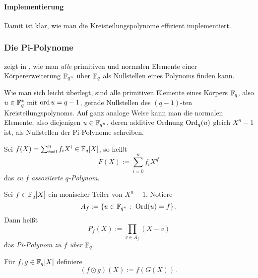 \paragraph{Implementierung}

Damit ist klar, wie man die Kreisteilungspolynome effizient implementiert.




\subsubsection{Die Pi-Polynome}

\citeauthor{hach92} zeigt in \autocite{hach92}, wie man
\emph{alle} primitiven und normalen Elemente einer Körpererweiterung $\mathbb{F}_{q^n}$
über $\mathbb{F}_q$ als Nullstellen eines Polynoms finden kann.

\begin{bemerkung}
  \label{bem:primnorm}
  Wie man sich leicht überlegt, sind alle primitiven Elemente eines Körpers
  $\mathbb{F}_q$, also $u \in \mathbb{F}_q^\ast$ mit $\operatorname{ord} u = q-1$, gerade Nullstellen des
  $(q-1)$-ten Kreisteilungspolynoms. Auf ganz analoge Weise kann man die normalen
  Elemente, also diejenigen $u\in \mathbb{F}_{q^n}$, deren additive Ordnung 
  $\operatorname{Ord}_q(u)$ gleich $X^n-1$ ist, als Nullstellen der Pi-Polynome schreiben.
\end{bemerkung}

\begin{definition}
  Sei $f(X) = \sum_{i=0}^n f_i X^i \in \mathbb{F}_q[X]$, so heißt 
  \[ F(X) := \sum_{i=0}^n f_i X^{q^i}\]
  das \emph{zu $f$ assoziierte $q$-Polynom}.
\end{definition}

\begin{definition}
  Sei $f \in \mathbb{F}_q[X]$ ein monischer Teiler von $X^n-1$. Notiere
  \[ A_f := \{ u \in \mathbb{F}_{q^n}:\ \operatorname{Ord}(u) = f\}\,.\]
  Dann heißt 
  \[ P_f(X) := \prod_{v\in A_f} (X-v)\]
  das \emph{Pi-Polynom zu $f$ über $\mathbb{F}_q$}.
\end{definition}

\begin{definition}
  Für $f,g\in \mathbb{F}_q[X]$ definiere
  \[ (f\odot g)(X) := f(G(X))\,.\]
\end{definition}

